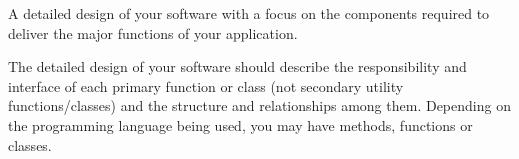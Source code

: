 A detailed design of your software with a focus on the components required to deliver the major functions of your application.

The detailed design of your software should describe the responsibility and interface of each primary function or class (not secondary utility functions/classes) and the structure and relationships among them. Depending on the programming language being used, you may have methods, functions or classes.
